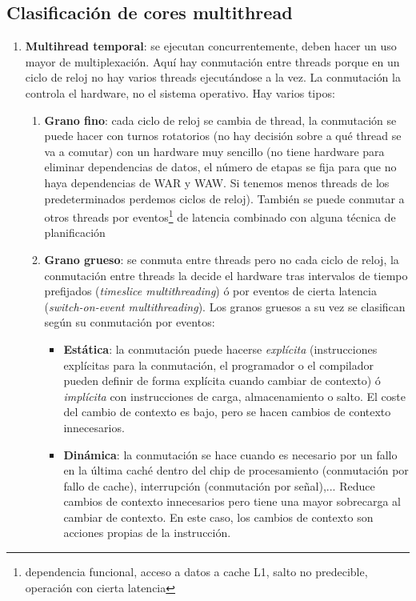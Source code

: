 \documentclass[10pt,a4paper,spanish]{report}
\begin{document}
\textcolor[rgb]{0.2,0.4,0.8}{\subsection{Clasificación de cores multithread}}
\begin{enumerate}[\color{azul}{\bf $\heartsuit$}]
    \item \textcolor[rgb]{0.2,0.4,0.8}{\textbf{Multihread temporal}}: se ejecutan concurrentemente, deben hacer un uso mayor de multiplexación. Aquí hay conmutación entre threads porque en un ciclo de reloj no hay varios threads ejecutándose a la vez. La conmutación la controla el hardware, no el sistema operativo. Hay varios tipos:
    \begin{enumerate}[$\longrightarrow$]
        \item \textcolor[rgb]{0.2,0.4,0.8}{\textbf{Grano fino}}: cada ciclo de reloj se cambia de thread, la conmutación se puede hacer con turnos rotatorios (no hay decisión sobre a qué thread se va a comutar) con un hardware muy sencillo (no tiene hardware para eliminar dependencias de datos, el número de etapas se fija para que no haya dependencias de WAR y WAW. Si tenemos menos threads de los predeterminados perdemos ciclos de reloj). También se puede conmutar a otros threads por eventos\footnote{dependencia funcional, acceso a datos a cache L1, salto no predecible, operación con cierta latencia} de latencia combinado con alguna técnica de planificación
        \item \textbf{\textcolor[rgb]{0.2,0.4,0.8}{Grano grueso}}: se conmuta entre threads pero no cada ciclo de reloj, la conmutación entre threads la decide el hardware tras intervalos de tiempo prefijados (\textcolor[rgb]{0.2,0.4,0.8}{\textit{timeslice multithreading}}) ó por eventos de cierta latencia (\textcolor[rgb]{0.2,0.4,0.8}{\textit{switch-on-event multithreading}}). Los granos gruesos a su vez se clasifican según su conmutación por eventos:
        \begin{itemize}
            \item \textcolor[rgb]{0.2,0.4,0.8}{\textbf{Estática}}: la conmutación puede hacerse \textit{\textcolor[rgb]{0.2,0.4,0.8}{explícita}} (instrucciones explícitas para la conmutación, el programador o el compilador pueden definir de forma explícita cuando cambiar de contexto) ó \textcolor[rgb]{0.2,0.4,0.8}{\textit{implícita}} con instrucciones de carga, almacenamiento o salto. El coste del cambio de contexto es bajo, pero se hacen cambios de contexto innecesarios.
            \item \textcolor[rgb]{0.2,0.4,0.8}{\textbf{Dinámica}}: la conmutación se hace cuando es necesario por un fallo en la última caché dentro del chip de procesamiento (conmutación por fallo de cache), interrupción (conmutación por señal),... Reduce cambios de contexto innecesarios pero tiene una mayor sobrecarga al cambiar de contexto. En este caso, los cambios de contexto son acciones propias de la instrucción.

\end{itemize}
\end{enumerate}
\end{enumerate}
\end{document}
